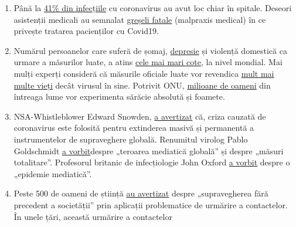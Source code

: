 \begin{enumerate}
{  sezoane}, dar multe studii ce privesc un „al doilea val'' se bazează
  pe
  \href{https://www.heise.de/tp/features/Fellay-Studie-Zweite-Corona-Welle-4726303.html}{presupuneri
  nerealiste}, cum ar fi o rată constantă a îmbolnăvirilor și deceselor
  pentru toate grupele de vârstă.
\item
  Până la
  \href{https://medium.com/@tepper_jonathan/ground-zero-when-the-cure-is-worse-than-the-disease-3c513d91393d}{41\%
  din infecțiile} cu coronavirus au avut loc chiar în spitale. Deseori
  asistenții medicali au semnalat
  \href{https://www.youtube.com/watch?v=UIDsKdeFOmQ}{greșeli fatale}
  (malpraxis medical) în ce privește tratarea pacienților cu Covid19.
\item
  Numărul persoanelor care suferă de șomaj,
  \href{https://eu.indystar.com/story/news/health/2020/04/03/coronavirus-indiana-how-get-help-mental-health-addiction/5104357002/}{depresie}
  și violență domestică ca urmare a măsurilor luate, a atins
  \href{https://eu.indystar.com/story/news/health/2020/04/03/coronavirus-indiana-how-get-help-mental-health-addiction/5104357002/}{cele
  mai mari cote}, la nivel mondial. Mai mulți experți consideră că
  măsurile oficiale luate vor revendica
  \href{https://www.nytimes.com/2020/03/20/opinion/coronavirus-pandemic-social-distancing.html}{mult
  mai multe vieți} decât virusul în sine. Potrivit ONU,
  \href{https://de.euronews.com/2020/04/22/un-warnen-welt-droht-wegen-corona-eine-hunger-pandemie-von-biblischen-ausma-en}{milioane
  de oameni} din întreaga lume vor experimenta sărăcie absolută și
  foamete.
\item
  NSA-Whistleblower Edward Snowden,
  \href{https://www.youtube.com/watch?v=-pcQFTzck_c}{a avertizat} că,
  criza cauzată de coronavirus este folosită pentru extinderea masivă și
  permanentă a instrumentelor de supraveghere globală. Renumitul virolog
  Pablo Goldschmidt
  \href{https://www.rubikon.news/artikel/der-corona-totalitarismus}{a
  vorbit}despre „teroarea mediatică globală'' și despre „măsuri
  totalitare''. Profesorul britanic de infecțiologie John Oxford
  \href{https://novuscomms.com/2020/03/31/a-view-from-the-hvivo-open-orphan-orph-laboratory-professor-john-oxford/}{a
  vorbit} despre o „epidemie mediatică''.
\item
  Peste 500 de oameni de știință
  \href{https://www.esat.kuleuven.be/cosic/sites/contact-tracing-joint-statement/}{au
  avertizat} despre „supravegherea fără precedent a societății'' prin
  aplicații problematice de urmărire a contactelor. În unele țări,
  această urmărire a contactelor

\end{enumerate}
